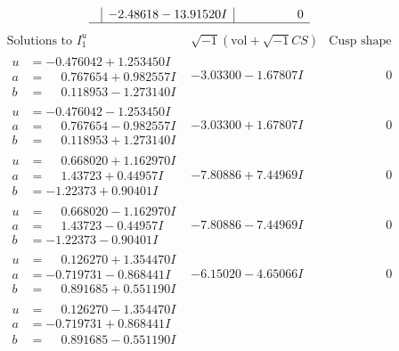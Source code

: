 \documentclass[1p]{elsarticle_modified}
\theoremstyle{definition}
\newcommand{\I}{\sqrt{-1}}
\begin{document}
$$\begin{array}{c|c|c}
 & -2.48618 - 13.91520 I & \phantom{-0.000000 } 0\\
 \hline 
 \end{array}$$\newpage$$\begin{array}{c|c|c}  
\text{Solutions to }I^u_{1}& \I (\text{vol} + \sqrt{-1}CS) & \text{Cusp shape}\\
 \hline 
\begin{aligned}
u &= -0.476042 + 1.253450 I \\
a &= \phantom{-}0.767654 + 0.982557 I \\
b &= \phantom{-}0.118953 - 1.273140 I\end{aligned}
 & -3.03300 - 1.67807 I & \phantom{-0.000000 } 0 \\ \hline\begin{aligned}
u &= -0.476042 - 1.253450 I \\
a &= \phantom{-}0.767654 - 0.982557 I \\
b &= \phantom{-}0.118953 + 1.273140 I\end{aligned}
 & -3.03300 + 1.67807 I & \phantom{-0.000000 } 0 \\ \hline\begin{aligned}
u &= \phantom{-}0.668020 + 1.162970 I \\
a &= \phantom{-}1.43723 + 0.44957 I \\
b &= -1.22373 + 0.90401 I\end{aligned}
 & -7.80886 + 7.44969 I & \phantom{-0.000000 } 0 \\ \hline\begin{aligned}
u &= \phantom{-}0.668020 - 1.162970 I \\
a &= \phantom{-}1.43723 - 0.44957 I \\
b &= -1.22373 - 0.90401 I\end{aligned}
 & -7.80886 - 7.44969 I & \phantom{-0.000000 } 0 \\ \hline\begin{aligned}
u &= \phantom{-}0.126270 + 1.354470 I \\
a &= -0.719731 - 0.868441 I \\
b &= \phantom{-}0.891685 + 0.551190 I\end{aligned}
 & -6.15020 - 4.65066 I & \phantom{-0.000000 } 0 \\ \hline\begin{aligned}
u &= \phantom{-}0.126270 - 1.354470 I \\
a &= -0.719731 + 0.868441 I \\
b &= \phantom{-}0.891685 - 0.551190 I\end{aligned}

\end{array}$$
\end{document}
